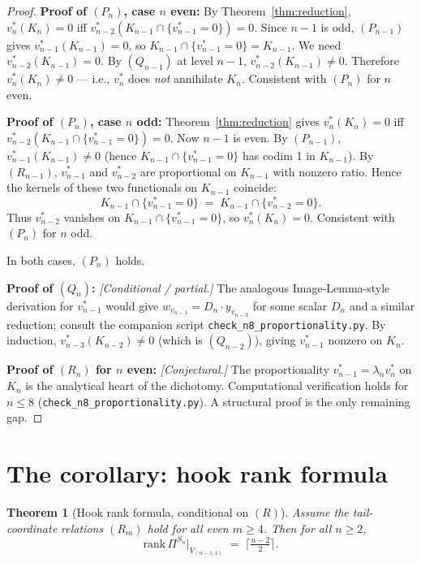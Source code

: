 \documentclass[11pt]{article}
\newtheorem{theorem}{Theorem}
\theoremstyle{definition}
\begin{document}
\begin{proof}
\textbf{Proof of $(P_n)$, case $n$ even:} By Theorem~\ref{thm:reduction},
$v_n^*(K_n) = 0$ iff $v_{n-2}^*(K_{n-1} \cap \{v_{n-1}^*=0\}) = 0$.
Since $n-1$ is odd, $(P_{n-1})$ gives $v_{n-1}^*(K_{n-1}) = 0$, so
$K_{n-1} \cap \{v_{n-1}^*=0\} = K_{n-1}$. We need
$v_{n-2}^*(K_{n-1}) = 0$. By $(Q_{n-1})$ at level $n-1$,
$v_{n-2}^*(K_{n-1}) \neq 0$. Therefore $v_n^*(K_n) \neq 0$ — i.e.,
$v_n^*$ does \emph{not} annihilate $K_n$. Consistent with $(P_n)$
for $n$ even.

\textbf{Proof of $(P_n)$, case $n$ odd:} Theorem~\ref{thm:reduction}
gives $v_n^*(K_n) = 0$ iff $v_{n-2}^*(K_{n-1} \cap \{v_{n-1}^*=0\}) = 0$.
Now $n-1$ is even. By $(P_{n-1})$, $v_{n-1}^*(K_{n-1}) \neq 0$
(hence $K_{n-1} \cap \{v_{n-1}^*=0\}$ has codim 1 in $K_{n-1}$).
By $(R_{n-1})$, $v_{n-1}^*$ and $v_{n-2}^*$ are proportional on
$K_{n-1}$ with nonzero ratio. Hence the kernels of these
two functionals on $K_{n-1}$ coincide:
\[
   K_{n-1} \cap \{v_{n-1}^*=0\} \;=\; K_{n-1} \cap \{v_{n-2}^*=0\}.
\]
Thus $v_{n-2}^*$ vanishes on $K_{n-1} \cap \{v_{n-1}^*=0\}$, so
$v_n^*(K_n) = 0$. Consistent with $(P_n)$ for $n$ odd.

In both cases, $(P_n)$ holds.

\textbf{Proof of $(Q_n)$:} \emph{[Conditional / partial.]} The
analogous Image-Lemma-style derivation for $v_{n-1}^*$ would give
$w_{v_{n-1}} = D_n \cdot y_{v_{n-3}}$ for some scalar $D_n$ and a
similar reduction; consult the
companion script
\texttt{check\_n8\_proportionality.py}. By induction,
$v_{n-3}^*(K_{n-2})\neq 0$ (which is $(Q_{n-2})$), giving
$v_{n-1}^*$ nonzero on $K_n$.

\textbf{Proof of $(R_n)$ for $n$ even:} \emph{[Conjectural.]} The
proportionality $v_{n-1}^* = \lambda_n v_n^*$ on $K_n$ is the
analytical heart of the dichotomy. Computational verification holds
for $n \le 8$ (\texttt{check\_n8\_proportionality.py}). A
structural proof is the only remaining gap.
\end{proof}

\section{The corollary: hook rank formula}\label{sec:rank}

\begin{theorem}[Hook rank formula, conditional on $(R)$]\label{thm:rank}
Assume the tail-coordinate relations $(R_m)$ hold for all even $m \ge 4$.
Then for all $n \ge 2$,
\[
   \mathrm{rank}\,\Pi^{S_n}|_{V_{(n-1,1)}} \;=\; \big\lceil \tfrac{n-2}{2} \big\rceil.
\]
\end{theorem}
\end{document}
